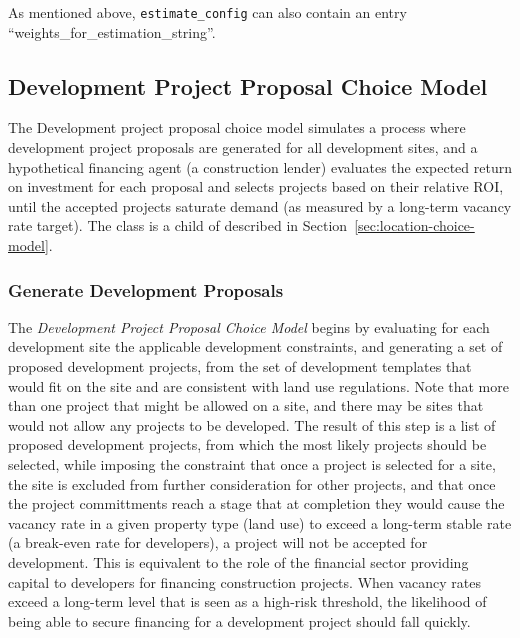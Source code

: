 As mentioned above, \verb|estimate_config| can also contain an entry ``weights_for_estimation_string''.


\subsection{Development Project Proposal Choice Model}
\label{sec:development-project-proposal-cm}
%
The Development project proposal choice model simulates a process where
development project proposals are generated for all development sites, and a hypothetical
financing agent (a construction lender) evaluates the expected return on investment
for each proposal and selects projects based on their relative ROI, until the accepted
projects saturate demand (as measured by a long-term vacancy rate target).
The class  is a child of
 described in
Section~\ref{sec:location-choice-model}.

\subsubsection{Generate Development Proposals}

The \emph{Development Project Proposal Choice Model} begins by evaluating for each development site 
the applicable development constraints, and
generating a set of proposed development projects, from the set of development templates
that would fit on the site and are consistent with land use regulations.  
Note that more than one project that might be allowed on a site, and
there may be sites that would not allow any projects to be developed.  The result of this step
is a list of proposed development projects, from which the most likely projects should be
selected, while imposing the constraint that once a project is selected for a site, the site is
excluded from further consideration for other projects, and that once the project committments
reach a stage that at completion they would cause the vacancy rate in a given property type (land
use) to exceed a long-term stable rate (a break-even rate for developers), a project will not be
accepted for development.  This is equivalent to the role of the financial sector providing
capital to developers for financing construction projects. When vacancy rates exceed a long-term
level that is seen as a high-risk threshold, the likelihood of being able to secure financing for
a development project should fall quickly.

